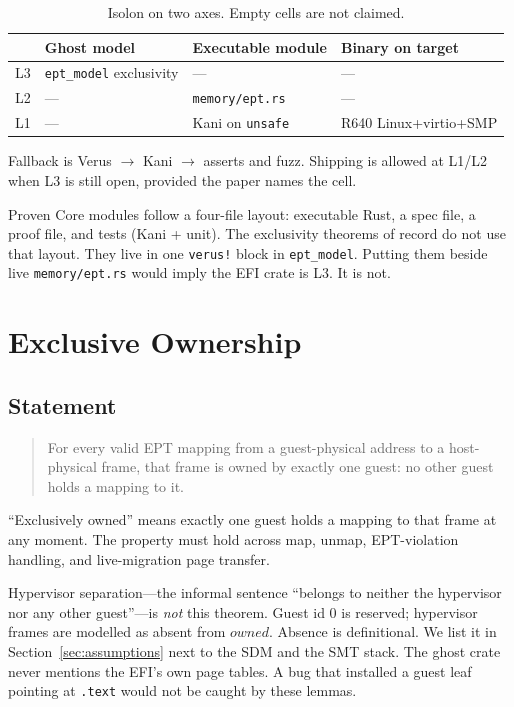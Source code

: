 \documentclass[sigplan,10pt,anonymous]{acmart}
\begin{document}
\begin{table}[t]
  \caption{Isolon on two axes. Empty cells are not claimed.}
  \label{tab:isolon-grid}
  \small
  \begin{tabularx}{\linewidth}{@{}l LLL@{}}
    \toprule
     & Ghost model & Executable module & Binary on target \\
    \midrule
    L3 & \texttt{ept\_model} exclusivity & --- & --- \\
    L2 & --- & \texttt{memory/ept.rs} & --- \\
    L1 & --- & Kani on \texttt{unsafe} & R640 Linux+virtio+SMP \\
    \bottomrule
  \end{tabularx}
\end{table}

Fallback is Verus $\rightarrow$ Kani $\rightarrow$ asserts and fuzz. Shipping
is allowed at L1/L2 when L3 is still open, provided the paper names the
cell.

Proven Core modules follow a four-file layout: executable Rust, a spec
file, a proof file, and tests (Kani + unit). The exclusivity theorems of
record do not use that layout. They live in one \texttt{verus!} block in
\texttt{ept\_model}. Putting them beside live \texttt{memory/ept.rs} would
imply the EFI crate is L3. It is not.

\section{Exclusive Ownership}

\subsection{Statement}

\begin{quote}
For every valid EPT mapping from a guest-physical address to a
host-physical frame, that frame is owned by exactly one guest: no other
guest holds a mapping to it.
\end{quote}

``Exclusively owned'' means exactly one guest holds a mapping to that frame
at any moment. The property must hold across map, unmap, EPT-violation
handling, and live-migration page transfer.

Hypervisor separation---the informal sentence ``belongs to neither the
hypervisor nor any other guest''---is \emph{not} this theorem. Guest id
$0$ is reserved; hypervisor frames are modelled as absent from
$\mathit{owned}$. Absence is definitional. We list it in
Section~\ref{sec:assumptions} next to the SDM and the SMT stack. The
ghost crate never mentions the EFI's own page tables. A bug that
installed a guest leaf pointing at \texttt{.text} would not be caught by
these lemmas.
\end{document}

